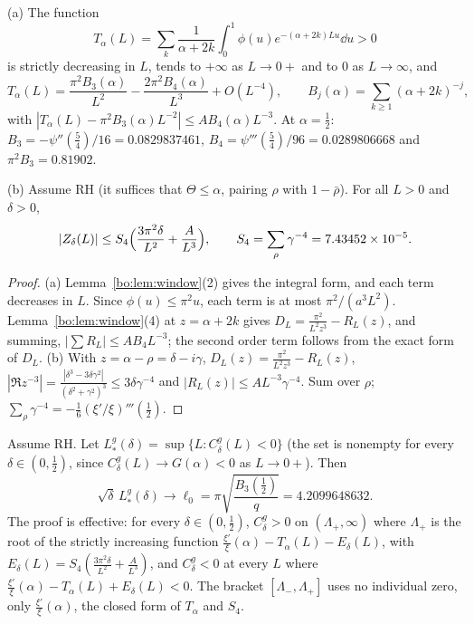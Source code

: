\begin{proposition}\label{bo:prop:remainders}
(a) The function
\[
T_\alpha(L)=\sum_k\frac1{\alpha+2k}\int_0^1\phi(u)e^{-(\alpha+2k)Lu}\dd u>0
\]
is strictly decreasing in $L$, tends to $+\infty$ as $L\to0+$ and to $0$ as $L\to\infty$, and
\[
T_\alpha(L)=\frac{\pi^2B_3(\alpha)}{L^2}-\frac{2\pi^2B_4(\alpha)}{L^3}+O(L^{-4}),\qquad B_j(\alpha)=\sum_{k\ge1}(\alpha+2k)^{-j},
\]
with $|T_\alpha(L)-\pi^2B_3(\alpha)L^{-2}|\le AB_4(\alpha)L^{-3}$. At $\alpha=\frac12$: $B_3=-\psi''(\frac54)/16=0.0829837461$, $B_4=\psi'''(\frac54)/96=0.0289806668$ and $\pi^2B_3=0.81902$.

(b) Assume RH (it suffices that $\Theta\le\alpha$, pairing $\rho$ with $1-\bar\rho$). For all $L>0$ and $\delta>0$,
\[
|Z_\delta(L)|\le S_4\Bigl(\frac{3\pi^2\delta}{L^2}+\frac A{L^3}\Bigr),\qquad S_4=\sum_\rho\gamma^{-4}=7.43452\times10^{-5}.
\]
\end{proposition}

\begin{proof}
(a) Lemma~\ref{bo:lem:window}(2) gives the integral form, and each term decreases in $L$. Since $\phi(u)\le\pi^2u$, each term is at most $\pi^2/(a^3L^2)$. Lemma~\ref{bo:lem:window}(4) at $z=\alpha+2k$ gives $D_L=\frac{\pi^2}{L^2z^3}-R_L(z)$, and summing, $|\sum R_L|\le AB_4L^{-3}$; the second order term follows from the exact form of $D_L$. (b) With $z=\alpha-\rho=\delta-i\gamma$, $D_L(z)=\frac{\pi^2}{L^2z^3}-R_L(z)$, $|\Re z^{-3}|=\frac{|\delta^3-3\delta\gamma^2|}{(\delta^2+\gamma^2)^3}\le3\delta\gamma^{-4}$ and $|R_L(z)|\le AL^{-3}\gamma^{-4}$. Sum over $\rho$; $\sum_\rho\gamma^{-4}=-\frac16(\xi'/\xi)'''(\frac12)$.
\end{proof}

\begin{theorem}\label{bo:thm:smooth}
Assume RH. Let $L^g_*(\delta)=\sup\{L:C^g_\delta(L)<0\}$ (the set is nonempty for every $\delta\in(0,\frac12)$, since $C^g_\delta(L)\to G(\alpha)<0$ as $L\to0+$). Then
\[
\sqrt\delta\,L^g_*(\delta)\longrightarrow\ell_0=\pi\sqrt{\frac{B_3(\frac12)}q}=4.2099648632 .
\]
The proof is effective: for every $\delta\in(0,\frac12)$, $C^g_\delta>0$ on $(\Lambda_+,\infty)$ where $\Lambda_+$ is the root of the strictly increasing function $\frac{\xi'}{\xi}(\alpha)-T_\alpha(L)-E_\delta(L)$, with $E_\delta(L)=S_4(\frac{3\pi^2\delta}{L^2}+\frac A{L^3})$, and $C^g_\delta<0$ at every $L$ where $\frac{\xi'}{\xi}(\alpha)-T_\alpha(L)+E_\delta(L)<0$. The bracket $[\Lambda_-,\Lambda_+]$ uses no individual zero, only $\frac{\xi'}{\xi}(\alpha)$, the closed form of $T_\alpha$ and $S_4$.
\end{theorem}


